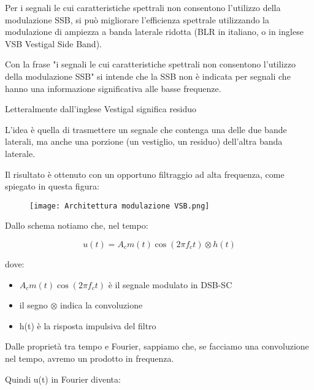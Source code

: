 Per i segnali le cui caratteristiche spettrali non consentono l'utilizzo della modulazione SSB, 
si può migliorare l'efficienza spettrale utilizzando la modulazione di ampiezza a banda laterale ridotta 
(BLR in italiano, o in inglese VSB Vestigal Side Band). \newline 

\begin{tcolorbox}
Con la frase "i segnali le cui caratteristiche spettrali non consentono l'utilizzo della modulazione SSB" 
si intende che la SSB non è indicata per segnali che hanno una informazione significativa alle basse frequenze.  \newline

Letteralmente dall'inglese Vestigal significa residuo
\end{tcolorbox}

L'idea è quella di trasmettere un segnale che contenga una delle due bande laterali, ma anche una porzione (un vestiglio, un residuo) 
dell'altra banda laterale. \newline 

Il risultato è ottenuto con un opportuno filtraggio ad alta frequenza, come spiegato in questa figura: 

\begin{figure}[h]
    \centering
    \texttt{[image: Architettura modulazione VSB.png]}
\end{figure} 

Dallo schema notiamo che, nel tempo: 

{
    \Large 
    \begin{equation}
        u (t) 
        = 
        A_c m(t) \cos(2 \pi f_c t) 
        \otimes
        h(t)
    \end{equation}
}

dove: 

\begin{itemize}
    \item $A_c m(t) \cos(2 \pi f_c t)$ è il segnale modulato in DSB-SC
    \item il segno $\otimes$ indica la convoluzione 
    \item h(t) è la risposta impulsiva del filtro 
\end{itemize}

Dalle proprietà tra tempo e Fourier, sappiamo che, se facciamo una convoluzione nel tempo, avremo un prodotto in frequenza. \newline 

Quindi u(t) in Fourier diventa: 

